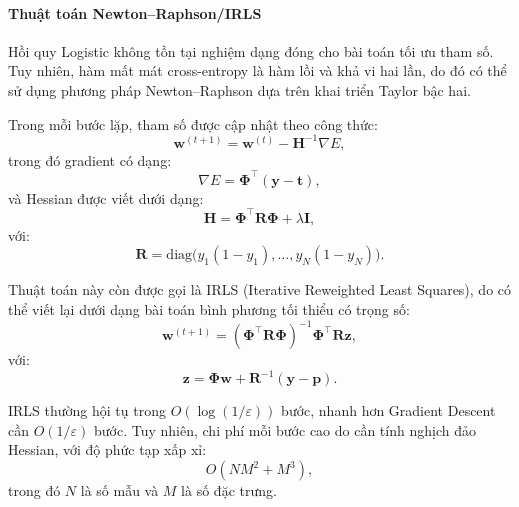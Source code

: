 \paragraph{Thuật toán Newton--Raphson/IRLS}

Hồi quy Logistic không tồn tại nghiệm dạng đóng cho bài toán tối ưu tham số.
Tuy nhiên, hàm mất mát cross-entropy là hàm lồi và khả vi hai lần, do đó có thể
sử dụng phương pháp Newton--Raphson dựa trên khai triển Taylor bậc hai.

Trong mỗi bước lặp, tham số được cập nhật theo công thức: \begin{equation}
  \boldsymbol{w}^{(t+1)} = \boldsymbol{w}^{(t)} - \boldsymbol{H}^{-1} \nabla E,
\end{equation} trong đó gradient có dạng: \begin{equation}
  \nabla E = \boldsymbol{\Phi}^{\intercal}(\boldsymbol{y} - \boldsymbol{t}),
\end{equation} và Hessian được viết dưới dạng: \begin{equation}
  \boldsymbol{H} = \boldsymbol{\Phi}^{\intercal} \boldsymbol{R}
  \boldsymbol{\Phi} + \lambda \boldsymbol{I},
\end{equation} với: \begin{equation}
  \boldsymbol{R} = \mathrm{diag}\big(y_1(1-y_1), \dots, y_N(1-y_N)\big).
\end{equation}

Thuật toán này còn được gọi là IRLS (Iterative Reweighted Least Squares), do có
thể viết lại dưới dạng bài toán bình phương tối thiểu có trọng số:
\begin{equation}
  \boldsymbol{w}^{(t+1)} =
  (\boldsymbol{\Phi}^{\intercal} \boldsymbol{R} \boldsymbol{\Phi})^{-1}
  \boldsymbol{\Phi}^{\intercal} \boldsymbol{R} \boldsymbol{z},
\end{equation} với: \begin{equation}
  \boldsymbol{z} = \boldsymbol{\Phi}\boldsymbol{w} +
  \boldsymbol{R}^{-1}(\boldsymbol{y}-\boldsymbol{p}).
\end{equation}

IRLS thường hội tụ trong $O(\log(1/\varepsilon))$ bước, nhanh hơn Gradient
Descent cần $O(1/\varepsilon)$ bước. Tuy nhiên, chi phí mỗi bước cao do cần
tính nghịch đảo Hessian, với độ phức tạp xấp xỉ: \begin{equation}
  O(NM^2 + M^3),
\end{equation} trong đó $N$ là số mẫu và $M$ là số đặc trưng.
